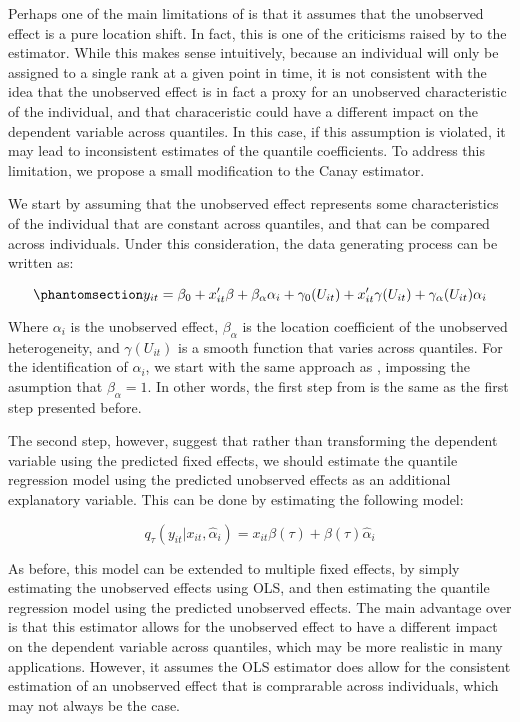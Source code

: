 \documentclass[bib]{statapress}
\begin{document}
Perhaps one of the main limitations of \citet{canay2011} is that it
assumes that the unobserved effect is a pure location shift. In fact,
this is one of the criticisms raised by \citet{mss2019} to the
estimator. While this makes sense intuitively, because an individual
will only be assigned to a single rank at a given point in time, it is
not consistent with the idea that the unobserved effect is in fact a
proxy for an unobserved characteristic of the individual, and that
characeristic could have a different impact on the dependent variable
across quantiles. In this case, if this assumption is violated, it may
lead to inconsistent estimates of the quantile coefficients. To address
this limitation, we propose a small modification to the Canay estimator.

We start by assuming that the unobserved effect represents some
characteristics of the individual that are constant across quantiles,
and that can be compared across individuals. Under this consideration,
the data generating process can be written as:

\begin{equation}\phantomsection\label{eq-mcanay-dgp}{y_{it} =\beta_0 +   x_{it}'\beta + \beta_\alpha \alpha_i+
\gamma_0(U_{it}) +  x_{it}'\gamma(U_{it}) + \gamma_\alpha(U_{it}) \alpha_i
}\end{equation}

Where \(\alpha_i\) is the unobserved effect, \(\beta_\alpha\) is the
location coefficient of the unobserved heterogeneity, and
\(\gamma(U_{it})\) is a smooth function that varies across quantiles.
For the identification of \(\alpha_i\), we start with the same approach
as \citet{canay2011}, impossing the asumption that \(\beta_\alpha=1\).
In other words, the first step from \citet{canay2011} is the same as the
first step presented before.

The second step, however, suggest that rather than transforming the
dependent variable using the predicted fixed effects, we should estimate
the quantile regression model using the predicted unobserved effects as
an additional explanatory variable. This can be done by estimating the
following model:

\[q_{\tau}(y_{it}|x_{it},\hat \alpha_i) =  x_{it}\beta(\tau)+\beta(\tau) \hat\alpha_i
\]

As before, this model can be extended to multiple fixed effects, by
simply estimating the unobserved effects using OLS, and then estimating
the quantile regression model using the predicted unobserved effects.
The main advantage over \citet{canay2011} is that this estimator allows
for the unobserved effect to have a different impact on the dependent
variable across quantiles, which may be more realistic in many
applications. However, it assumes the OLS estimator does allow for the
consistent estimation of an unobserved effect that is comprarable across
individuals, which may not always be the case.
\end{document}
